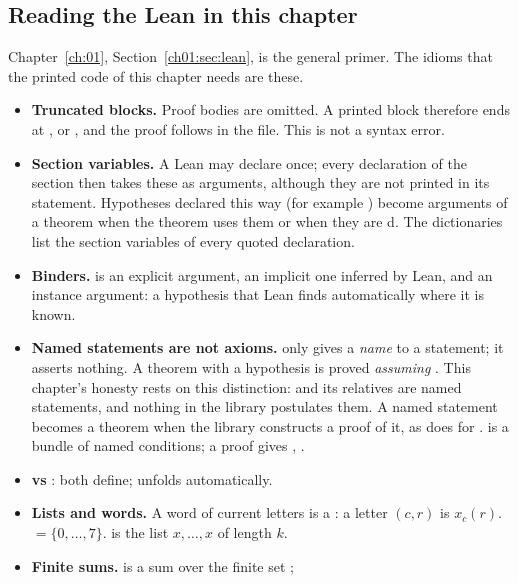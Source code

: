 \subsection{Reading the Lean in this chapter}\label{l26:sec:readlean}

Chapter~\ref{ch:01}, Section~\ref{ch01:sec:lean}, is the general primer. The idioms that the printed code of this chapter
needs are these.
\begin{itemize}
\item \textbf{Truncated blocks.} Proof bodies are omitted. A printed block therefore ends at \lean{:=},  or
  , and the proof follows in the file. This is not a syntax error.
\item \textbf{Section variables.} A Lean  may declare  once; every
  declaration of the section then takes these as arguments, although they are not printed in its statement. Hypotheses
  declared this way (for example ) become arguments of a theorem when the theorem uses them or
  when they are d. The dictionaries list the section variables of every quoted declaration.
\item \textbf{Binders.}  is an explicit argument,  an implicit one inferred by Lean, and
  \lean{[FiniteDimensional ℂ V]} an instance argument: a hypothesis that Lean finds automatically where it is known.
\item \textbf{Named statements are not axioms.}  only gives a \emph{name} to a statement; it asserts
  nothing. A theorem with a hypothesis  is proved \emph{assuming} . This chapter's honesty rests on this
  distinction:  and its relatives are named statements, and nothing in the library postulates them.
  A named statement becomes a theorem when the library constructs a proof of it, as  does for
  .
   is a bundle of named conditions; a proof  gives , .
\item \textbf{ vs }: both define;  unfolds automatically.
\item \textbf{Lists and words.} A word of current letters is a : a letter $(c,r)$ is $x_c(r)$.
   $=\{0,\dots,7\}$.  is the list $x,\dots,x$ of length $k$.
\item \textbf{Finite sums.}  is a sum over the finite set ; 

\end{itemize}
